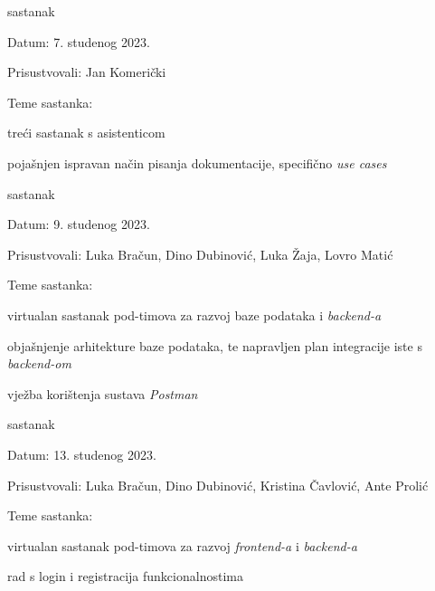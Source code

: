 \begin{packed_enum}
			\item  sastanak
			\item[] \begin{packed_item}
				\item Datum: 7. studenog 2023.
				\item Prisustvovali: Jan Komerički
				\item Teme sastanka:
				\begin{packed_item}
					\item  treći sastanak s asistenticom
					\item  pojašnjen ispravan način pisanja dokumentacije, specifično \textit{use cases}
				\end{packed_item}
			\end{packed_item}
			
			\item  sastanak
			\item[] \begin{packed_item}
				\item Datum: 9. studenog 2023.
				\item Prisustvovali: Luka Bračun, Dino Dubinović, Luka Žaja, Lovro Matić
				\item Teme sastanka:
				\begin{packed_item}
					\item  virtualan sastanak pod-timova za razvoj baze podataka i \textit{backend-a}
					\item  objašnjenje arhitekture baze podataka, te napravljen plan integracije iste s \textit{backend-om}
					\item  vježba korištenja sustava \textit{Postman}
				\end{packed_item}
			\end{packed_item}
			
			\item  sastanak
			\item[] \begin{packed_item}
				\item Datum: 13. studenog 2023.
				\item Prisustvovali: Luka Bračun, Dino Dubinović, Kristina Čavlović, Ante Prolić
				\item Teme sastanka:
				\begin{packed_item}
					\item  virtualan sastanak pod-timova za razvoj \textit{frontend-a} i \textit{backend-a}
					\item  rad s login i registracija funkcionalnostima
				\end{packed_item}
			\end{packed_item}
			

\end{packed_enum}
